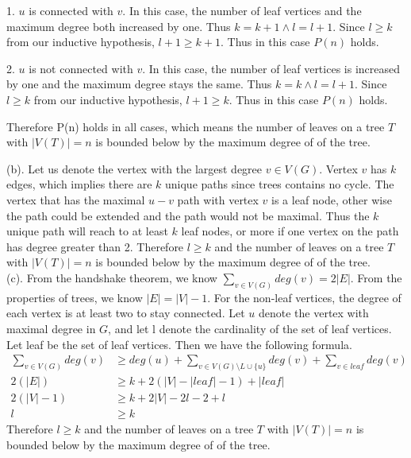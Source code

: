 \documentclass[12pt]{article}
\begin{document}
	1. $u$ is connected with $v$. In this case, the number of leaf vertices and the maximum degree both increased by one. Thus $k = k+1 \land l = l+1$. Since $l \geq k$ from our inductive hypothesis, $l+1 \geq k+1$. Thus in this case $P(n)$ holds.
	
	2. $u$ is not connected with $v$. In this case, the number of leaf vertices is increased by one and the maximum degree stays the same. Thus $k = k \land l = l+1$. Since $l \geq k$ from our inductive hypothesis, $l+1 \geq k$. Thus in this case $P(n)$ holds.
	
	Therefore P(n) holds in all cases, which means the number of leaves
	on a tree $T$ with $|V(T)| = n$ is bounded below by the maximum degree of of the tree.\\
	
	\newpage
	
	\noindent (b). Let us denote the vertex with the largest degree $v \in V(G)$. Vertex $v$ has $k$ edges, which implies there are $k$ unique paths since trees contains no cycle. The vertex that has the maximal $u-v$ path with vertex $v$ is a leaf node, other wise the path could be extended and the path would not be maximal. Thus the $k$ unique path will reach to at least $k$ leaf nodes, or more if one vertex on the path has degree greater than 2. Therefore $l \geq k$ and the number of leaves 
	on a tree $T$ with $|V(T)| = n$ is bounded below by the maximum degree of of the tree.\\
	
	\noindent (c). From the handshake theorem, we know $\sum_{v \in V(G)} deg(v) = 2|E| $. From the properties of trees, we know $|E| = |V|-1$. For the non-leaf vertices, the degree of each vertex is at least two to stay connected. Let $u$ denote the vertex with maximal degree in $G$, and let l denote the cardinality of the set of leaf vertices. Let leaf be the set of leaf vertices. Then we have the following formula.
	\begin{align*}
		\sum_{v \in V(G)} deg(v) &\geq deg(u) + \sum_{v \in V(G) \setminus L \cup \{u\}} deg(v)+ \sum_{v \in leaf} deg(v) \\
		 2(|E|) &\geq k + 2(|V|-|leaf|-1) + |leaf|\\
		 2(|V|-1) &\geq k + 2|V| - 2l -2 + l\\
		 l &\geq k 
	\end{align*}
	Therefore $l \geq k$ and the number of leaves 
	on a tree $T$ with $|V(T)| = n$ is bounded below by the maximum degree of of the tree.\\
	
\end{document}
